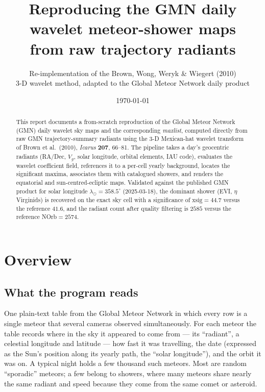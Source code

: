 \documentclass[11pt]{article}
\title{\textbf{Reproducing the GMN daily wavelet meteor-shower maps\\
from raw trajectory radiants}}
\author{Re-implementation of the Brown, Wong, Weryk \& Wiegert (2010)\\
3-D wavelet method, adapted to the Global Meteor Network daily product}
\date{\today}
\begin{document}
\maketitle

\begin{abstract}
\noindent
This report documents a from-scratch reproduction of the Global Meteor Network
(GMN) daily wavelet sky maps and the corresponding \emph{maxlist}, computed
directly from raw GMN trajectory-summary radiants using the 3-D Mexican-hat
wavelet transform of Brown et al.\ (2010), \textit{Icarus} \textbf{207}, 66--81.
The pipeline takes a day's geocentric radiants (RA/Dec, $V_g$, solar longitude,
orbital elements, IAU code), evaluates the wavelet coefficient field, references
it to a per-cell yearly background, locates the significant maxima, associates
them with catalogued showers, and renders the equatorial and sun-centred-ecliptic
maps. Validated against the published GMN product for solar longitude
$\lambda_\odot = 358.5^\circ$ (2025-03-18), the dominant shower (EVI, $\eta$
Virginids) is recovered on the exact sky cell with a significance of
$\mathrm{xsig}=44.7$ versus the reference $41.6$, and the radiant count after
quality filtering is $2585$ versus the reference NOrb${}=2574$.
\end{abstract}

\section{Overview}
\label{sec:overview}

\subsection{What the program reads}
One plain-text table from the Global Meteor Network in which every row is a single
meteor that several cameras observed simultaneously. For each meteor the table
records where in the sky it appeared to come from --- its ``radiant'', a celestial
longitude and latitude --- how fast it was travelling, the date (expressed as the
Sun's position along its yearly path, the ``solar longitude''), and the orbit it
was on. A typical night holds a few thousand such meteors. Most are random
``sporadic'' meteors; a few belong to showers, where many meteors share nearly the
same radiant and speed because they come from the same comet or asteroid.
\end{document}
